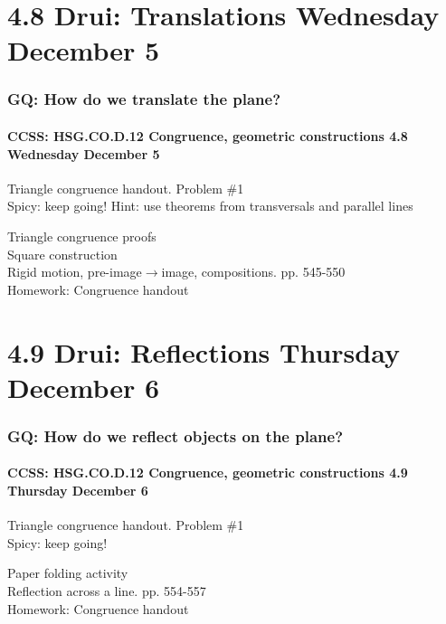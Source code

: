 \documentclass{beamer}
\begin{document}
  \section{4.8 Drui: Translations Wednesday December 5}
    \frame
    {
      \frametitle{GQ: How do we translate the plane?}
      \framesubtitle{CCSS: HSG.CO.D.12 Congruence, geometric constructions  \alert{4.8 Wednesday December 5}}

      \begin{block}{Triangle congruence handout. Problem \#1 \\ Spicy: keep going!}
        Hint: use theorems from transversals and parallel lines
      \end{block} \vspace{0.5cm}
      Triangle congruence proofs\\
      Square construction\\
      Rigid motion, pre-image$\rightarrow$image, compositions. pp. 545-550\\[0.5cm]
      Homework: Congruence handout
    }

  \section{4.9 Drui: Reflections Thursday December 6}
    \frame
    {
      \frametitle{GQ: How do we reflect objects on the plane?}
      \framesubtitle{CCSS: HSG.CO.D.12 Congruence, geometric constructions  \alert{4.9 Thursday December 6}}

      \begin{block}{Triangle congruence handout. Problem \#1 \\ Spicy: keep going!}
      \end{block} \vspace{0.5cm}
      Paper folding activity\\
      Reflection across a line. pp. 554-557\\[0.5cm]
      Homework: Congruence handout
    }
\end{document}
